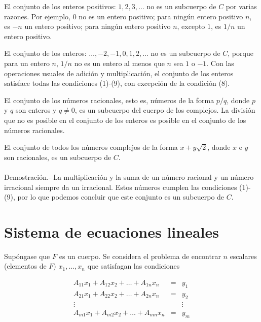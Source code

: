 \begin{ejem}
    El conjunto de los enteros positivos: $1,2,3,\ldots$ no es un subcuerpo de $C$ por varias razones. Por ejemplo, $0$ no es un entero positivo; para ningún entero positivo $n$, es $-n$ un entero positivo; para ningún entero positivo $n$, excepto $1$, es $1/n$ un entero positivo.
\end{ejem}

\begin{ejem}
    El conjunto de los enteros: $\ldots,-2,-1,0,1,2,\ldots$ no es un subcuerpo de $C$, porque para un entero $n$, $1/n$ no es un entero al menos que $n$ sea $1$ o $-1$. Con las operaciones usuales de adición y multiplicación, el conjunto de los enteros satisface todas las condiciones (1)-(9), con excepción de la condición (8).
\end{ejem}

\begin{ejem}
    El conjunto de los números racionales, esto es, números de la forma $p/q$, donde $p$ y $q$ son enteros y $q\neq 0$, es un subcuerpo del cuerpo de los complejos. La división que no es posible en el conjunto de los enteros es posible en el conjunto de los números racionales.
\end{ejem}

\begin{ejem}
    El conjunto de todos los números complejos de la forma $x+y\sqrt{2}$, donde $x$ e $y$ son racionales, es un subcuerpo de $C$.\\\\
	Demostración.-\; La multiplicación y la suma de un número racional y un número irracional siempre da un irracional. Estos números cumplen las condiciones (1)-(9), por lo que podemos concluir que este conjunto es un subcuerpo de $C$.
\end{ejem}

\section{Sistema de ecuaciones lineales}
Supóngase que $F$ es un cuerpo. Se considera el problema de encontrar $n$ escalares (elementos de $F$) $x_1,\ldots,x_n$ que satisfagan las condiciones 

\begin{equation}
    \begin{array}{ccc}
	A_{11}x_1+A_{12}x_2+\ldots + A_{1n}x_n&=&y_1\\
	A_{21}x_1+A_{22}x_2+\ldots + A_{2n}x_n&=&y_2\\
	\vdots &&\vdots\\
	A_{m1}x_1+A_{m2}x_2+\ldots + A_{mn}x_n&=&y_m
    \end{array}
\end{equation}

